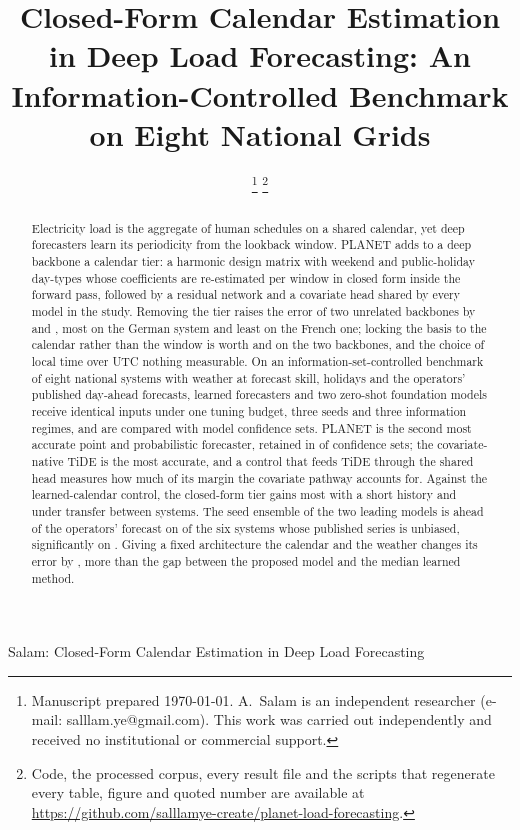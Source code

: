 \documentclass[journal]{IEEEtran}
\begin{document}
\title{Closed-Form Calendar Estimation in Deep Load Forecasting: An Information-Controlled Benchmark on Eight National Grids}

\author{%
%
\thanks{Manuscript prepared \today. A.~Salam is an independent researcher (e-mail: salllam.ye@gmail.com). This work was carried out independently and received no institutional or commercial support.}%
\thanks{Code, the processed corpus, every result file and the scripts that regenerate every table, figure and quoted number are available at \url{https://github.com/salllamye-create/planet-load-forecasting}.}%
}

%
{Salam: Closed-Form Calendar Estimation in Deep Load Forecasting}

\maketitle

\begin{abstract}
Electricity load is the aggregate of human schedules on a shared calendar, yet deep
forecasters learn its periodicity from the lookback window. PLANET adds to a deep backbone a
calendar tier: a harmonic design matrix with weekend and public-holiday day-types whose
coefficients are re-estimated per window in closed form inside the forward pass, followed by
a residual network and a covariate head shared by every model in the study. Removing the tier
raises the error of two unrelated backbones by  and
, most on the German system and least on the
French one; locking the basis to the calendar rather than the window is worth
 and  on the two
backbones, and the choice of local time over UTC nothing measurable. On an information-set-controlled benchmark of eight national systems with weather
at forecast skill, holidays and the operators' published day-ahead forecasts,
 learned forecasters and two zero-shot foundation models receive
identical inputs under one tuning budget, three seeds and three information regimes, and are
compared with model confidence sets. PLANET is the second most accurate point and
probabilistic forecaster, retained in  of 
confidence sets; the covariate-native TiDE is the most accurate, and a control that feeds
TiDE through the shared head measures how much of its margin the covariate pathway accounts
for. Against the learned-calendar control, the closed-form tier gains most with a short
history and under transfer between systems. The seed ensemble of the two leading models is ahead of the operators' forecast on
 of the six systems whose published series is
unbiased, significantly on . Giving a fixed architecture the calendar and the weather changes
its error by , more than the gap between the proposed model and the median learned method.
\end{abstract}
\end{document}
